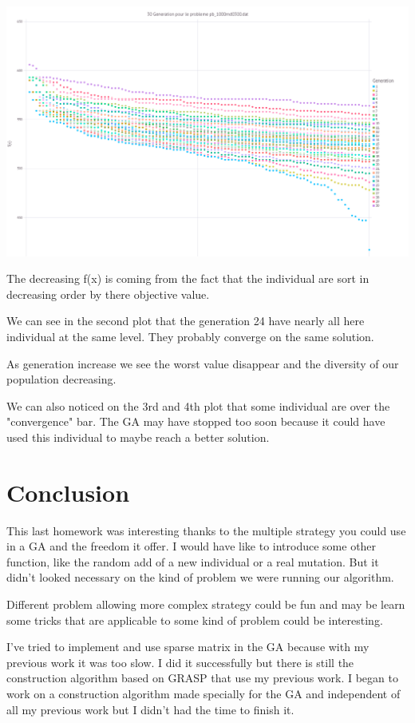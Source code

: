 \documentclass[12pt]{article}
\begin{document}
\begin{center}
		\includegraphics[scale=0.5]{1000rnd0300.png}
	\end{center}
	The decreasing f(x) is coming from the fact that the individual are sort in decreasing order by there objective value.
	
	We can see in the second plot that the generation 24 have nearly all here individual at the same level. They probably converge on the same solution.
	
	As generation increase we see the worst value disappear and the diversity of our population decreasing.
	
	We can also noticed on the 3rd and 4th plot that some individual are over the "convergence" bar. The GA may have stopped too soon because it could have used this individual to maybe reach a better solution.
	
	\section{Conclusion}
	
	This last homework was interesting thanks to the multiple strategy you could use in a GA and the freedom it offer. I would have like to introduce some other function, like the random add of a new individual or a real mutation. But it didn't looked necessary on the kind of problem we were running our algorithm.
	
	Different problem allowing more complex strategy could be fun and may be learn some tricks that are applicable to some kind of problem could be interesting. 
	
	I've tried to implement and use sparse matrix in the GA because with my previous work it was too slow. I did it successfully but there is still the construction algorithm based on GRASP that use my previous work. I began to work on a construction algorithm made specially for the GA and independent of all my previous work but I didn't had the time to finish it.
	
\end{document}
